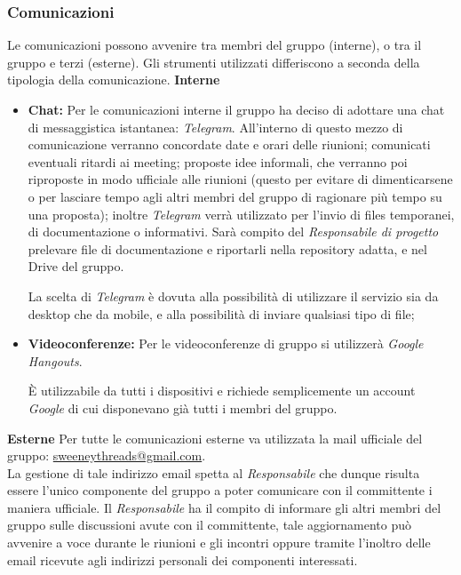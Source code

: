 \documentclass[a4paper]{article}
\begin{document}
	\subsubsection{Comunicazioni}
	Le comunicazioni possono avvenire tra membri del gruppo (interne), o tra il gruppo e terzi (esterne). Gli
	strumenti utilizzati differiscono a seconda della tipologia della comunicazione.
	\textbf{Interne}
	\begin{itemize}
		\item \textbf{Chat:} Per le comunicazioni interne il gruppo ha deciso di adottare una chat di messaggistica
		istantanea: \emph{Telegram}. All'interno di questo mezzo di comunicazione verranno concordate date e orari
		delle riunioni; comunicati eventuali ritardi ai meeting; proposte idee informali, che verranno poi riproposte
		in modo ufficiale alle riunioni (questo per evitare di dimenticarsene o per lasciare tempo agli altri membri
		del gruppo di ragionare più tempo su una proposta); inoltre \emph{Telegram} verrà utilizzato per l'invio di files
		temporanei, di documentazione o informativi. Sarà compito del \emph{Responsabile di progetto} prelevare file di documentazione
		e riportarli nella repository adatta, e nel Drive del gruppo.

		La scelta di \emph{Telegram} è dovuta alla possibilità di utilizzare il servizio sia da desktop che da mobile, e alla
		possibilità di inviare qualsiasi tipo di file;
		\item \textbf{Videoconferenze:} Per le videoconferenze di gruppo si utilizzerà \emph{Google Hangouts}.

		È utilizzabile da tutti i dispositivi e richiede semplicemente un account \emph{Google} di cui disponevano
		già tutti i membri del gruppo.
	\end{itemize}
	\textbf{Esterne}
	Per tutte le comunicazioni esterne va utilizzata la mail ufficiale del gruppo: \href{mailto:sweeneythreads@gmail.com}{sweeneythreads@gmail.com}.
	 \\ La gestione di tale indirizzo email spetta al \emph{Responsabile} che dunque risulta essere l'unico componente del gruppo a poter comunicare
	con il committente i maniera ufficiale. Il \emph{Responsabile} ha il compito di informare gli altri membri del gruppo sulle
	discussioni avute con il committente, tale aggiornamento può avvenire a voce durante le riunioni e gli incontri oppure tramite
	l'inoltro delle email ricevute agli indirizzi personali dei componenti interessati.
	\\ \\
\end{document}
